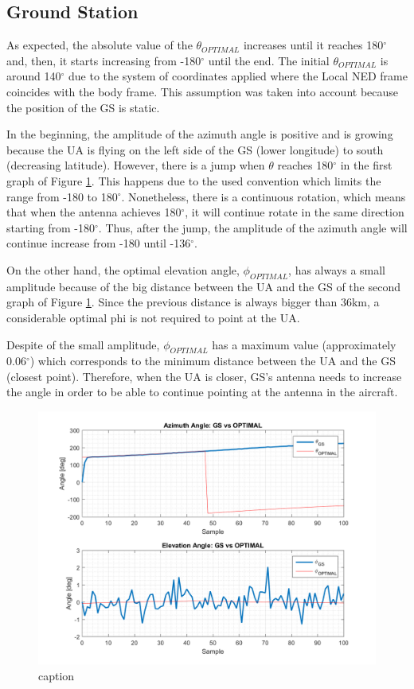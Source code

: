 \subsection{Ground Station}
As expected, the absolute value of the $\theta_{OPTIMAL}$ increases until it reaches 180$^{\circ}$  and, then, it starts increasing from -180$^{\circ}$ until the end. The initial $\theta_{OPTIMAL}$ is around 140$^{\circ}$ due to the system of coordinates applied where the Local NED frame coincides with the body frame. This assumption was taken into account because the position of the GS is static.

In the beginning, the amplitude of the azimuth angle is positive and is growing because the UA is flying on the left side of the GS (lower longitude) to south (decreasing latitude). However, there is a jump when $\theta$ reaches 180$^{\circ}$ in the first graph of Figure \ref{fig:s1_pd_gs_alone}. This happens due to the used convention which limits the range from -180 to 180$^{\circ}$. Nonetheless, there is a continuous rotation, which means that when the antenna achieves 180$^{\circ}$, it will continue rotate in the same direction starting from -180$^{\circ}$. Thus, after the jump, the amplitude of the azimuth angle will continue increase from -180 until -136$^{\circ}$.

On the other hand, the optimal elevation angle, $\phi_{OPTIMAL}$, has always a small amplitude because of the big distance between the UA and the GS of the second graph of Figure \ref{fig:s1_pd_gs_alone}. Since the previous distance is always bigger than 36km, a considerable optimal phi is not required to point at the UA. 

Despite of the small amplitude, $\phi_{OPTIMAL}$ has a maximum value (approximately 0.06$^{\circ}$) which corresponds to the minimum distance between the UA and the GS (closest point). Therefore, when the UA is closer, GS’s antenna needs to increase the angle in order to be able to continue pointing at the antenna in the aircraft.

\begin{figure}[H]
	\centering
	\includegraphics[scale=0.75]{figures/s1_pd_gs.png}
	\caption{caption}
	\label{fig:s1_pd_gs_alone}
\end{figure}

